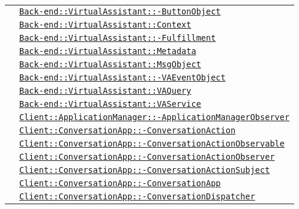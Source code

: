 \begin{longtable}{|>{\centering}m{3cm}|m{10cm}<{\centering}|}
& \hyperref[Back-end::VirtualAssistant::ButtonObject]{\texttt{Back-end::VirtualAssistant::-\linebreak ButtonObject}}\\
& \hyperref[Back-end::VirtualAssistant::Context]{\texttt{Back-end::VirtualAssistant::Context}}\\
& \hyperref[Back-end::VirtualAssistant::Fulfillment]{\texttt{Back-end::VirtualAssistant::-\linebreak Fulfillment}}\\
& \hyperref[Back-end::VirtualAssistant::Metadata]{\texttt{Back-end::VirtualAssistant::Metadata}}\\
& \hyperref[Back-end::VirtualAssistant::MsgObject]{\texttt{Back-end::VirtualAssistant::MsgObject}}\\
& \hyperref[Back-end::VirtualAssistant::VAEventObject]{\texttt{Back-end::VirtualAssistant::-\linebreak VAEventObject}}\\
& \hyperref[Back-end::VirtualAssistant::VAQuery]{\texttt{Back-end::VirtualAssistant::VAQuery}}\\
& \hyperref[Back-end::VirtualAssistant::VAService]{\texttt{Back-end::VirtualAssistant::VAService}}\\
& \hyperref[Client::ApplicationManager::ApplicationManagerObserver]{\texttt{Client::ApplicationManager::-\linebreak ApplicationManagerObserver}}\\
& \hyperref[Client::ConversationApp::ConversationAction]{\texttt{Client::ConversationApp::-\linebreak ConversationAction}}\\
& \hyperref[Client::ConversationApp::ConversationActionObservable]{\texttt{Client::ConversationApp::-\linebreak ConversationActionObservable}}\\
& \hyperref[Client::ConversationApp::ConversationActionObserver]{\texttt{Client::ConversationApp::-\linebreak ConversationActionObserver}}\\
& \hyperref[Client::ConversationApp::ConversationActionSubject]{\texttt{Client::ConversationApp::-\linebreak ConversationActionSubject}}\\
& \hyperref[Client::ConversationApp::ConversationApp]{\texttt{Client::ConversationApp::-\linebreak ConversationApp}}\\
& \hyperref[Client::ConversationApp::ConversationDispatcher]{\texttt{Client::ConversationApp::-\linebreak ConversationDispatcher}}\\

\end{longtable}
